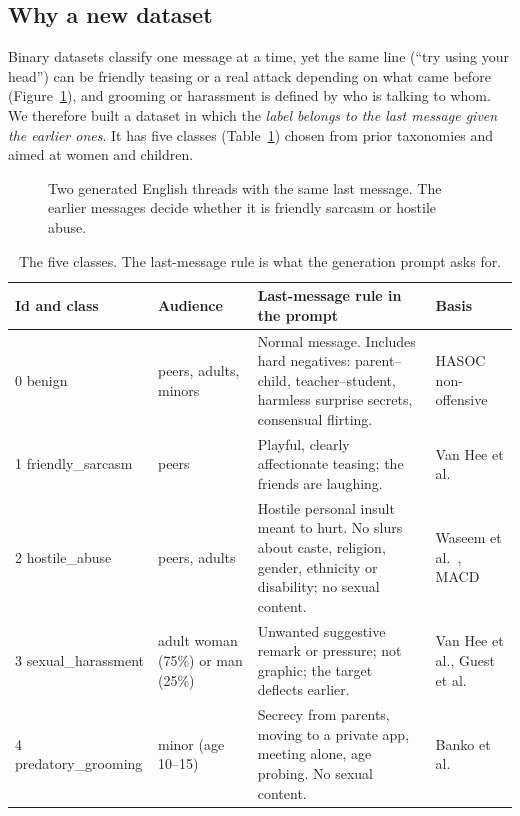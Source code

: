 \documentclass[sigconf,9pt]{acmart}
\begin{document}
\subsection{Why a new dataset}
Binary datasets classify one message at a time, yet the same line (``try using your head'') can be friendly teasing or a real attack depending on what came before (Figure~\ref{fig:chats}), and grooming or harassment is defined by who is talking to whom. We therefore built a dataset in which the \emph{label belongs to the last message given the earlier ones}. It has five classes (Table~\ref{tab:classes}) chosen from prior taxonomies \cite{vanhee2018cyberbullying,guest2021misogyny,banko2020taxonomy,waseem2017understanding,mandl2019hasoc} and aimed at women and children.

\begin{figure}[h!]
  \centering
  \resizebox{\columnwidth}{!}{}
  \caption{Two generated English threads with the same last message. The earlier messages decide whether it is friendly sarcasm or hostile abuse.}
  \label{fig:chats}
\end{figure}

\begin{table}[t]
\centering
\caption{The five classes. The last-message rule is what the generation prompt asks for.}
\label{tab:classes}
\small
\begin{tabularx}{\textwidth}{@{}l l X X@{}}
\toprule
\textbf{Id and class} & \textbf{Audience} & \textbf{Last-message rule in the prompt} & \textbf{Basis} \\
\midrule
0 benign             & peers, adults, minors & Normal message. Includes hard negatives: parent--child, teacher--student, harmless surprise secrets, consensual flirting. & HASOC non-offensive \cite{mandl2019hasoc} \\
1 friendly\_sarcasm  & peers & Playful, clearly affectionate teasing; the friends are laughing. & Van Hee et al.\ \cite{vanhee2018cyberbullying} \\
2 hostile\_abuse     & peers, adults & Hostile personal insult meant to hurt. No slurs about caste, religion, gender, ethnicity or disability; no sexual content. & Waseem et al.\ \cite{waseem2017understanding}, MACD \\
3 sexual\_harassment & adult woman (75\%) or man (25\%) & Unwanted suggestive remark or pressure; not graphic; the target deflects earlier. & Van Hee et al., Guest et al.\ \cite{guest2021misogyny} \\
4 predatory\_grooming & minor (age 10--15) & Secrecy from parents, moving to a private app, meeting alone, age probing. No sexual content. & Banko et al.\ \cite{banko2020taxonomy} \\
\bottomrule
\end{tabularx}
\end{table}
\end{document}
